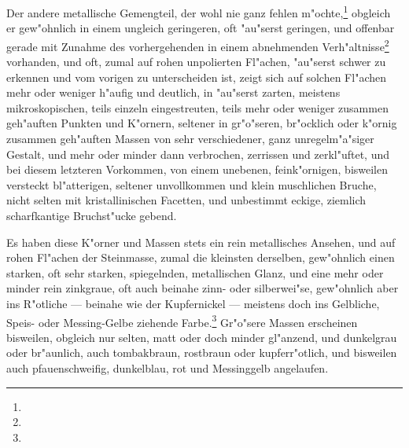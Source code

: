 \documentclass[a4paper, 11pt, oneside, german]{article}
\begin{document}
Der andere metallische Gemengteil, der wohl nie ganz fehlen m"ochte,\footnote{} obgleich er gew"ohnlich in einem ungleich geringeren, oft "au"serst geringen, und offenbar gerade mit Zunahme des vorhergehenden in einem abnehmenden Verh"altnisse\footnote{} vorhanden, und oft, zumal auf rohen unpolierten Fl"achen, "au"serst schwer zu erkennen und vom vorigen zu unterscheiden ist, zeigt sich auf solchen Fl"achen mehr oder weniger h"aufig und deutlich, in "au"serst zarten, meistens mikroskopischen, teils einzeln eingestreuten, teils mehr oder weniger zusammen geh"auften Punkten und K"ornern, seltener in gr"o"seren, br"ocklich oder k"ornig zusammen geh"auften Massen von sehr verschiedener, ganz unregelm"a"siger Gestalt, und mehr oder minder dann verbrochen, zerrissen und zerkl"uftet, und bei diesem letzteren Vorkommen, von einem unebenen, feink"ornigen, bisweilen versteckt bl"atterigen, seltener unvollkommen und klein muschlichen Bruche, nicht selten mit kristallinischen Facetten, und unbestimmt eckige, ziemlich scharfkantige Bruchst"ucke gebend.

Es haben diese K"orner und Massen stets ein rein metallisches Ansehen, und auf rohen Fl"achen der Steinmasse, zumal die kleinsten derselben, gew"ohnlich einen starken, oft sehr starken, spiegelnden, metallischen Glanz, und eine mehr oder minder rein zinkgraue, oft auch beinahe zinn- oder silberwei"se, gew"ohnlich aber ins R"otliche --- beinahe wie der Kupfernickel --- meistens doch ins Gelbliche, Speis- oder Messing-Gelbe ziehende Farbe.\footnote{} Gr"o"sere Massen erscheinen bisweilen, obgleich nur selten, matt oder doch minder gl"anzend, und dunkelgrau oder br"aunlich, auch tombakbraun, rostbraun oder kupferr"otlich, und bisweilen auch pfauenschweifig, dunkelblau, rot und Messinggelb angelaufen.
\end{document}
